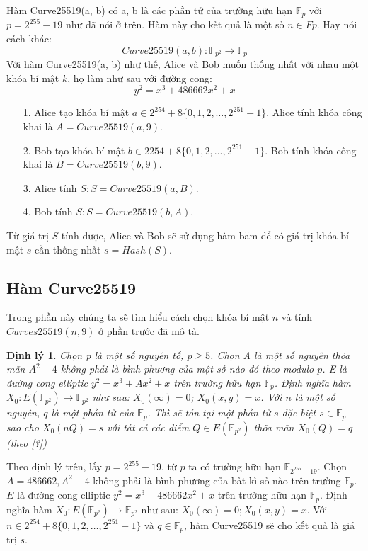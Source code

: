 \documentclass[a4paper,12pt]{report}
\newtheorem{theorem}{Định lý}[chapter]
\begin{document}
Hàm Curve25519(a, b) có a, b là các phần tử của trường hữu hạn $\mathbb{F}_p$ với $p = 2^{255} - 19$ như đã nói ở trên. Hàm này cho kết quả là một số $n \in Fp$. Hay nói cách khác:
\begin{displaymath}
Curve25519(a, b): \mathbb{F}_{p^2} \rightarrow \mathbb{F}_p
\end{displaymath}
Với hàm Curve25519(a, b) như thế, Alice và Bob muốn thống nhất với nhau một khóa bí mật $k$, họ làm như sau với đường cong:
\begin{displaymath}
y^2 = x^3 + 486662x^2 + x
\end{displaymath}
\begin{itemize}
\item[1. ] Alice tạo khóa bí mật $a \in 2^{254} + 8\{0, 1, 2, \ldots, 2^{251} - 1\}$. Alice tính khóa công khai là $A = Curve25519(a, 9)$.
\item[2. ] Bob tạo khóa bí mật $b \in 2254 + 8\{0, 1, 2, ..., 2^{251} - 1\}$. Bob tính khóa công khai là $B = Curve25519(b, 9)$.
\item[3. ] Alice tính $S: S = Curve25519(a, B)$.
\item[4. ] Bob tính $S: S = Curve25519(b, A)$.
\end{itemize}
Từ giá trị $S$ tính được, Alice và Bob sẽ sử dụng hàm băm để có giá trị khóa bí mật $s$ cần thống nhất $s = Hash(S)$.
\subsection*{Hàm Curve25519}
Trong phần này chúng ta sẽ tìm hiểu cách chọn khóa bí mật $n$ và tính $Curves25519(n, 9)$ ở phần trước đã mô tả.
\begin{theorem} \label{dl4.1}
Chọn p là một số nguyên tố, $p \geq 5$. Chọn A là một số nguyên thõa mãn $A^2 - 4$ không phải là bình phương của một số nào đó theo modulo $p$. E là đường cong elliptic $y^2 = x^3 + Ax^2 + x$ trên trường hữu hạn $\mathbb{F}_p$. Định nghĩa hàm $X_0 : E(\mathbb{F}_{p^2} ) \rightarrow  \mathbb{F}_{p^2}$ như sau: $X_0(\infty) = 0$; $X_0(x, y) = x$. Với $n$ là một số nguyên, $q$ là một phần tử của $\mathbb{F}_p$. Thì sẽ tồn tại một phần tử $s$ đặc biệt $s \in \mathbb{F}_p$ sao cho $X_0(nQ) = s$ với tất cả các điểm $Q \in E(\mathbb{F}_{p^2} )$ thõa mãn $X_0(Q) = q$ (theo [?])
\end{theorem}

Theo định lý trên, lấy $p = 2^255 - 19$, từ $p$ ta có trường hữu hạn $\mathbb{F}_{2^{255}-19}$. Chọn $A = 486662,A^2 - 4$ không phải là bình phương của bất kì số nào trên trường $\mathbb{F}_p$. $E$ là đường cong elliptic $y^2 = x^3 + 486662x^2 + x$ trên trường hữu hạn $\mathbb{F}_p$. Định nghĩa hàm $X_0 : E(\mathbb{F}_{p^2} ) \rightarrow \mathbb{F}_{p^2}$ như sau: $X_0(\infty) = 0; X_0(x, y) = x$. Với $n \in 2^{254} + 8\{0, 1, 2, \ldots, 2^{251} - 1\}$ và $q \in \mathbb{F}_p$, hàm Curve25519 sẽ cho kết quả là giá trị $s$.
\end{document}
